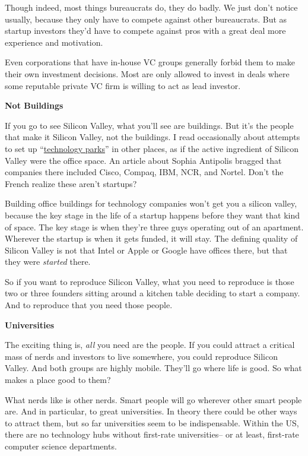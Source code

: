 \documentclass[12pt]{book}
\begin{document}
Though indeed, most things bureaucrats do, they do badly. We just don't
notice usually, because they only have to compete against other
bureaucrats. But as startup investors they'd have to compete against
pros with a great deal more experience and motivation.

Even corporations that have in-house VC groups generally forbid them to
make their own investment decisions. Most are only allowed to invest in
deals where some reputable private VC firm is willing to act as lead
investor.

\textbf{Not Buildings}

If you go to see Silicon Valley, what you'll see are buildings. But it's
the people that make it Silicon Valley, not the buildings. I read
occasionally about attempts to set up
``\href{http://www.google.com/search?q=technology+park}{technology
parks}'' in other places, as if the active ingredient of Silicon Valley
were the office space. An article about Sophia Antipolis bragged that
companies there included Cisco, Compaq, IBM, NCR, and Nortel. Don't the
French realize these aren't startups?

Building office buildings for technology companies won't get you a
silicon valley, because the key stage in the life of a startup happens
before they want that kind of space. The key stage is when they're three
guys operating out of an apartment. Wherever the startup is when it gets
funded, it will stay. The defining quality of Silicon Valley is not that
Intel or Apple or Google have offices there, but that they were
\emph{started} there.

So if you want to reproduce Silicon Valley, what you need to reproduce
is those two or three founders sitting around a kitchen table deciding
to start a company. And to reproduce that you need those people.

\textbf{Universities}

The exciting thing is, \emph{all} you need are the people. If you could
attract a critical mass of nerds and investors to live somewhere, you
could reproduce Silicon Valley. And both groups are highly mobile.
They'll go where life is good. So what makes a place good to them?

What nerds like is other nerds. Smart people will go wherever other
smart people are. And in particular, to great universities. In theory
there could be other ways to attract them, but so far universities seem
to be indispensable. Within the US, there are no technology hubs without
first-rate universities-- or at least, first-rate computer science
departments.
\end{document}
